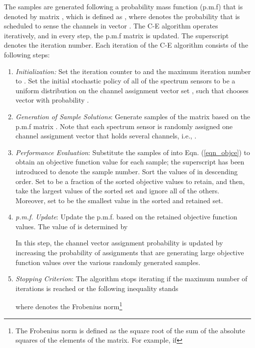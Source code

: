 \documentclass[journal]{IEEEtran} \ifCLASSINFOpdf
\begin{document}
The  samples are generated following a probability mass function (p.m.f) that is denoted by matrix , which is defined as , where  denotes the probability that  is scheduled to sense the channels in vector . The C-E algorithm operates iteratively, and in every step, the p.m.f matrix is updated. The superscript  denotes the iteration number. Each iteration of the C-E algorithm consists of the following steps:
\begin{enumerate}[]
\item \textit{Initialization:} Set the iteration counter to  and the maximum iteration number to . Set the initial stochastic policy of all of the spectrum sensors to be a uniform distribution on the channel assignment vector set , such that  chooses vector  with probability .

\item \textit{Generation of Sample Solutions}: Generate  samples of the matrix  based on the p.m.f matrix . Note that each spectrum sensor is randomly assigned one channel assignment vector that holds several channels, i.e., . \label{ce_gs}

\item \textit{Performance Evaluation}: Substitute the  samples of  into Eqn. (\ref{eqn_objce}) to obtain an objective function value  for each sample; the superscript  has been introduced to denote the sample number. Sort the  values of  in descending order. Set  to be a fraction of the sorted objective values to retain, and then, take the largest  values of the sorted set and ignore all of the others. Moreover, set  to be the smallest value in the sorted and retained set.

\item \textit{p.m.f. Update}: Update the p.m.f. based on the retained objective function values. The value of  is determined by
    
In this step, the channel vector assignment probability  is updated by increasing the probability of assignments that are generating large objective function values over the various randomly generated samples.

\item \textit{Stopping Criterion}: The algorithm stops iterating if the maximum number of iterations  is reached or the following inequality stands

where  denotes the Frobenius norm\footnote{The Frobenius norm is defined as the square root of the sum of the absolute squares of the elements of the matrix. For example, if

}
\end{enumerate}
\end{document}
